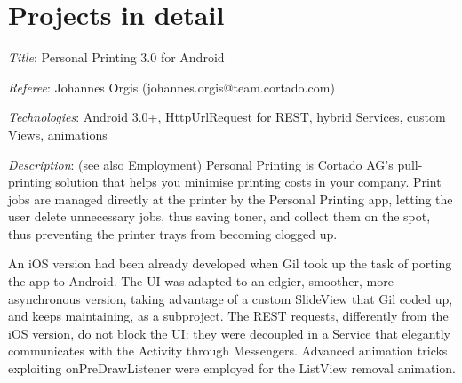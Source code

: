 \documentclass[letterpaper]{article}
\renewenvironment{itemize}{
  \begin{list}{}{
    \setlength{\leftmargin}{1.5em}
  }
}{
  \end{list}
}
\newenvironment{itemize1}{
  \begin{list}{}{
    \setlength{\leftmargin}{0em}
  }
}{
  \end{list}
}
\begin{document}
\section*{Projects in detail}
\begin{itemize1}
\item
\begin{itemize}
\item {\it Title}: Personal Printing 3.0 for Android 
\item {\it Referee}: Johannes Orgis (johannes.orgis@team.cortado.com)
\item {\it Technologies}: Android 3.0+, HttpUrlRequest for REST, hybrid Services, custom Views, animations
\item {\it Description}: (see also Employment) Personal Printing is Cortado AG's pull-printing solution that helps you minimise printing costs in your company. Print jobs are managed directly at the printer by the Personal Printing app, letting the user delete unnecessary jobs, thus saving toner, and collect them on the spot, thus preventing the printer trays from becoming clogged up.
\medskip

An iOS version had been already developed when Gil took up the task of porting the app to Android. The UI was adapted to an edgier, smoother, more asynchronous version, taking advantage of a custom SlideView that Gil coded up, and keeps maintaining, as a subproject. The REST requests, differently from the iOS version, do not block the UI: they were decoupled in a Service that elegantly communicates with the Activity through Messengers. Advanced animation tricks exploiting onPreDrawListener were employed for the ListView removal animation.
\end{itemize}

\bigskip


\end{itemize1}
\end{document}
